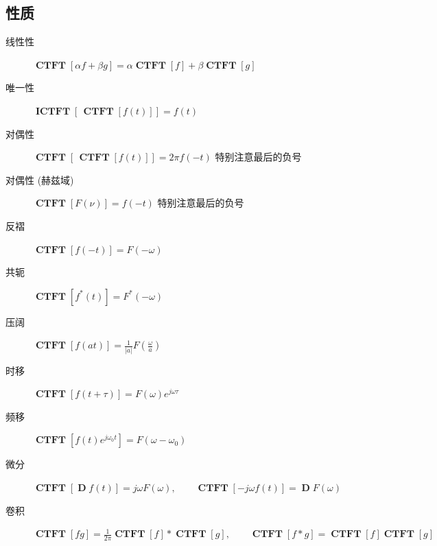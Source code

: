 \documentclass{ctexart}
\DeclareMathOperator{\CTFT}{\mathbf{CTFT}}
\DeclareMathOperator{\ICTFT}{\mathbf{ICTFT}}
\DeclareMathOperator{\D}{\mathbf{D}}
\begin{document}
\subsection{性质}
    \begin{description}
        \item[线性性] $\displaystyle \CTFT[\alpha f + \beta g] = \alpha \CTFT[f] + \beta \CTFT[g]$
        \item[唯一性] $\displaystyle \ICTFT[ \, \CTFT[f(t)] ] = f(t)$
        \item[对偶性] $\displaystyle \CTFT [ \, \CTFT[ f(t) ] ] = 2 \pi f(-t)$ 特别注意最后的负号
        \item[对偶性 (赫兹域)] $\displaystyle \CTFT [ F(\nu) ] = f(-t)$ 特别注意最后的负号
        \item[反褶] $\displaystyle \CTFT[f(-t)] = F(-\omega)$
        \item[共轭] $\displaystyle \CTFT[f^*(t)] = F^*(-\omega)$
        \item[压阔] $\displaystyle \CTFT[f(at)] = \frac{1}{|a|} F(\frac{\omega}{a})$
        \item[时移] $\displaystyle \CTFT[f(t + \tau)] = F(\omega) e^{j \omega \tau}$
        \item[频移] $\displaystyle \CTFT[f(t) e^{j \omega_0 t}] = F(\omega - \omega_0)$
        \item[微分] $\displaystyle \CTFT[\D f(t)] = j \omega F(\omega),\qquad \CTFT[-j \omega f(t)] = \D F(\omega)$
        \item[卷积] $\displaystyle \CTFT[f g] = \frac{1}{2\pi} \CTFT[f] * \CTFT[g],\qquad \CTFT[f * g] = \CTFT[f] \CTFT[g]$
    \end{description}
\end{document}
